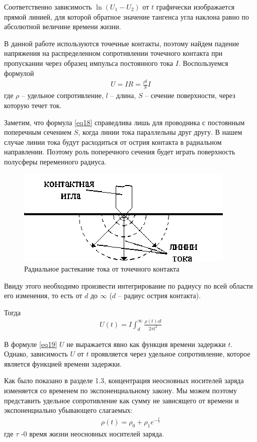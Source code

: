 Соответственно зависимость $\ln(U_1-U_2)$ от $t$ графически изображается прямой линией, для которой обратное значение тангенса угла наклона равно по абсолютной величине времени жизни.

В данной работе используются точечные контакты, поэтому найдем падение напряжения на распределенном сопротивлении точечного контакта при пропускании через образец импульса постоянного тока $I$. Воспользуемся формулой
\begin{gather}
	\label{eq18}
	U=I R=\frac{\rho l}{S} I
\end{gather}
где $\rho$ -- удельное сопротивление, $l$ -- длина, $S$ -- сечение поверхности, через которую течет ток. 

Заметим, что формула \eqref{eq18} справедлива лишь для проводника с постоянным поперечным сечением $S$, когда линии тока параллельны друг другу. 
В нашем случае линии тока будут расходиться от острия контакта в радиальном направлении. Поэтому роль поперечного сечения будет играть поверхность полусферы переменного радиуса.
\begin{figure}[H]
	\centering
	\includegraphics[]{img/11}
	\caption{Радиальное растекание тока от точечного контакта}
	\label{fig:figure10}
\end{figure}

Ввиду этого необходимо произвести интегрирование по радиусу по всей области его изменения, то есть от $d$ до $\infty$ ($d$ -- радиус острия контакта). 

Тогда
\begin{gather}
	\label{eq19}
	U(t)=I \int_{d}^{\infty} \frac{\rho(t) \dd l}{2 \pi l^{2}}
\end{gather}

В формуле \eqref{eq19} $U$ не выражается явно как функция времени задержки $t$. Однако, зависимость $U$ от $t$ проявляется через удельное сопротивление, которое является функцией времени задержки.

Как было показано в разделе 1.3, концентрация неосновных носителей заряда изменяется со временем по экспоненциальному закону. Мы можем поэтому представить удельное сопротивление как сумму не зависящего от времени и экспоненциально убывающего слагаемых: 
\begin{gather}
	\label{eq20}
	\rho(t)=\rho_{0}+\rho_{1} e^{-\frac{t}{\tau}}
\end{gather}
где $\tau$ -0 время жизни неосновных носителей заряда.

